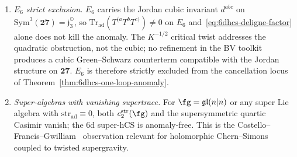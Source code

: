 \begin{corollary}
\begin{enumerate}[label=\textup{(\alph*)}]
 Gell-Mann cubic $d^{abc}$ and enters the locus only in its
 refined form: the Feigin--Frenkel critical-level $K^{-1/2}$ twist
 of clause~(b) kills the quadratic obstruction, and the
 Dimofte-slab anomaly-inflow of Part~V provides the
 Green--Schwarz cubic cancellation of $d^{abc}\int c^a\wedge
 c^b\wedge\bar\partial c^c$; the combined refinement places
 $A_2$-refined inside the cancellation locus, while $A_2$-unrefined
 remains outside.
\item \emph{$E_6$ strict exclusion.} $E_6$ carries the Jordan
 cubic invariant $d^{abc}$ on $\mathrm{Sym}^3(\mathbf{27})=
 \mathfrak j_3^{\mathbb O}$, so
 $\mathrm{Tr}_{\mathrm{ad}}(T^{(a}T^bT^{c)})\neq 0$ on $E_6$
 and~\eqref{eq:6dhcs-deligne-factor} alone does not kill the
 anomaly. The $K^{-1/2}$ critical twist addresses the quadratic
 obstruction, not the cubic; no refinement in the BV toolkit
 produces a cubic Green--Schwarz counterterm compatible with the
 Jordan structure on $\mathbf{27}$. $E_6$ is therefore strictly
 excluded from the cancellation locus of
 Theorem~\ref{thm:6dhcs-one-loop-anomaly}.
\item \emph{Super-algebras with vanishing supertrace.} For
 $\fg=\mathfrak{gl}(n|n)$ or any super Lie algebra with
 $\mathrm{str}_{\mathrm{ad}}\equiv 0$, both
 $c_2^{\mathrm{str}}(\fg)$ and the supersymmetric quartic Casimir
 vanish; the 6d super-hCS is anomaly-free. This is the
 Costello--Francis--Gwilliam~\cite{CFG2026} observation relevant
 for holomorphic Chern--Simons coupled to twisted supergravity.
\end{enumerate}
\end{corollary}

